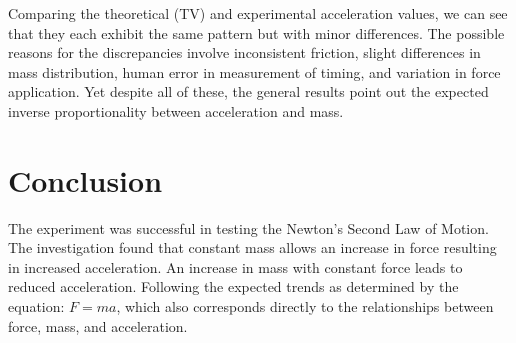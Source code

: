 \documentclass[a4paper,12pt]{article}
\begin{document}
Comparing the theoretical (TV) and experimental acceleration values, we can see that they each exhibit the same pattern but with minor differences. The possible reasons for the discrepancies involve inconsistent friction, slight differences in mass distribution, human error in measurement of timing, and variation in force application. Yet despite all of these, the general results point out the expected inverse proportionality between acceleration and mass.

\section{Conclusion}

The experiment was successful in testing the Newton's Second Law of Motion. The investigation found that constant mass allows an increase in force resulting in increased acceleration. An increase in mass with constant force leads to reduced acceleration. Following the expected trends as determined by the equation: \( F = ma \), which also corresponds directly to the relationships between force, mass, and acceleration.

\printbibliography
\end{document}
